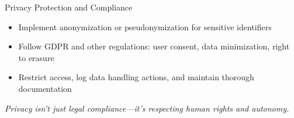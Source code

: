 \documentclass[aspectratio=169]{beamer}
\begin{document}
%
%
%
\begin{frame}{Privacy Protection and Compliance}
\begin{itemize}
\item Implement anonymization or pseudonymization for sensitive identifiers
\item Follow GDPR and other regulations: user consent, data minimization, right to erasure
\item Restrict access, log data handling actions, and maintain thorough documentation
\end{itemize}

\vspace{0.8em}
\emph{Privacy isn’t just legal compliance—it’s respecting human rights and autonomy.}

\end{frame}
\end{document}
